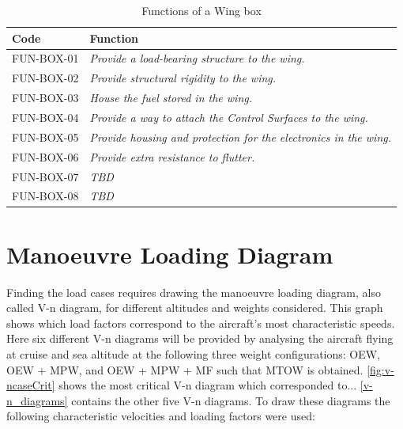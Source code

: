 \begin{table}[H]
    \centering
    \caption{Functions of a Wing box}
    \begin{tabularx}{\textwidth}{|p{} |p{}|}
        \hline
        \cellcolor{blue!15}\textbf{Code} & \cellcolor{blue!15}\textbf{Function} \\
        \hline

        \cellcolor{blue!15} FUN-BOX-01 & \textit{Provide a load-bearing structure to the wing.}\\
        \hline
        \cellcolor{blue!15} FUN-BOX-02 & \textit{Provide structural rigidity to the wing.}\\
        \hline
        \cellcolor{blue!15} FUN-BOX-03 & \textit{House the fuel stored in the wing.}\\
        \hline
        \cellcolor{blue!15} FUN-BOX-04 & \textit{Provide a way to attach the Control Surfaces to the wing.}\\
        \hline
        \cellcolor{blue!15} FUN-BOX-05 & \textit{Provide housing and protection for the electronics in the wing.}\\
        \hline
        \cellcolor{blue!15} FUN-BOX-06 & \textit{Provide extra resistance to flutter.}\\
        \hline
        \cellcolor{blue!15} FUN-BOX-07 & \textit{TBD}\\
        \hline
        \cellcolor{blue!15} FUN-BOX-08 & \textit{TBD}\\
        \hline
        
        
    \end{tabularx}
      
        \label{tab:Wingbox_functions}
\end{table}
\section{Manoeuvre Loading Diagram}
\label{sec:Loading_Diagrams}

\noindent Finding the load cases requires drawing the manoeuvre loading diagram, also called V-n diagram, for different altitudes and weights considered. This graph shows which load factors correspond to the aircraft's most characteristic speeds. Here six different V-n diagrams will be provided by analysing the aircraft flying at cruise and sea altitude at the following three weight configurations: OEW, OEW + MPW, and OEW + MPW + MF such that MTOW is obtained. \autoref{fig:v-ncaseCrit} shows the most critical V-n diagram which corresponded to... \autoref{v-n_diagrams} contains the other five V-n diagrams. To draw these diagrams the following characteristic velocities and loading factors were used:

